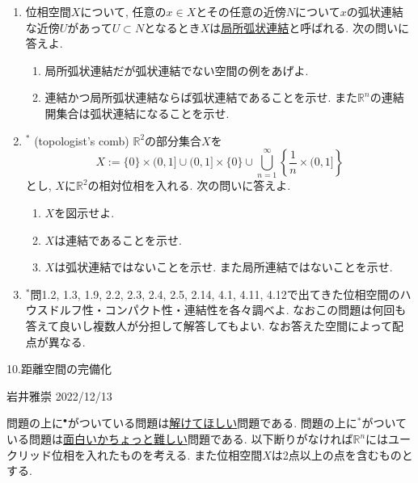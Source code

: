 \documentclass[dvipdfmx,a4paper,11pt]{article}
\newcommand{\R}{\mathbb{R}}
\theoremstyle{definition}
\begin{document}
\begin{enumerate}[label=\textbf{問}9.\arabic*]
\item 位相空間$X$について, 任意の$x \in X$とその任意の近傍$N$について$x$の弧状連結な近傍$U$があって$U \subset N$となるとき$X$は\underline{局所弧状連結}と呼ばれる. 次の問いに答えよ.
	\begin{enumerate}
	\setlength{\parskip}{0cm}
  \setlength{\itemsep}{2pt}
	\item 局所弧状連結だが弧状連結でない空間の例をあげよ.
	\item 連結かつ局所弧状連結ならば弧状連結であることを示せ. また$\R^n$の連結開集合は弧状連結になることを示せ. 
	\end{enumerate}
\item $^{*}$ (topologist's comb) $\R^2$の部分集合$X$を
$$
X := \{ 0\} \times (0,1] \cup (0,1] \times \{ 0 \} \cup \bigcup_{n=1}^{\infty}\left\{ \frac{1}{n} \times (0,1] \right\}
$$
とし, $X$に$\R^2$の相対位相を入れる. 次の問いに答えよ. 
	\begin{enumerate}
	\setlength{\parskip}{0cm}
  \setlength{\itemsep}{2pt}
  \item $X$を図示せよ. 
  \item $X$は連結であることを示せ.
  \item $X$は弧状連結ではないことを示せ. また局所連結ではないことを示せ.
  	\end{enumerate}


\item $^{*}$問1.2, 1.3, 1.9, 2.2, 2.3, 2.4, 2.5, 2.14, 4.1, 4.11, 4.12で出てきた位相空間のハウスドルフ性・コンパクト性・連結性を各々調べよ.
なおこの問題は何回も答えて良いし複数人が分担して解答してもよい. なお答えた空間によって配点が異なる.


 \end{enumerate}
 
\newpage



\begin{center}
{\Large 10.距離空間の完備化}
\end{center}

\begin{flushright}
 岩井雅崇 2022/12/13
\end{flushright}

問題の上に$^{\bullet}$がついている問題は\underline{解けてほしい}問題である. 問題の上に$^{*}$がついている問題は\underline{面白いかちょっと難しい}問題である.  以下断りがなければ$\R^{n}$にはユークリッド位相を入れたものを考える. また位相空間$X$は2点以上の点を含むものとする.
\end{document}

